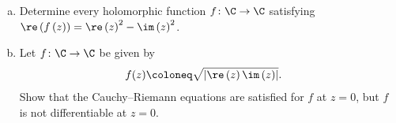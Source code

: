 \documentclass[10pt]{mypackage}
\begin{document}
\RaggedRight
\begin{problem}[Problem 1]\hfill
  \begin{enumerate}[(a)]
    \item Determine every holomorphic function $f\colon \C\rightarrow \C$ satisfying $\re\left( f\left( z \right) \right) = \re\left( z \right)^2 - \im\left( z \right)^2$.
    \item Let $f\colon \C\rightarrow \C$ be given by
      \begin{align*}
        f(z) &\coloneq \sqrt{\left\vert \re\left( z \right)\im\left( z \right) \right\vert}.
      \end{align*}
      Show that the Cauchy--Riemann equations are satisfied for $f$ at $z = 0$, but $f$ is not differentiable at $z = 0$.
  \end{enumerate}
\end{problem}
\end{document}
